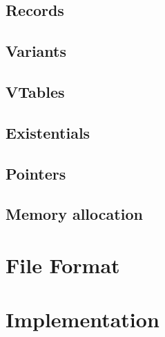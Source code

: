 \documentclass[a4paper]{book}
\begin{document}
\chapter{Records}

\chapter{Variants}
\chapter{VTables}
\chapter{Existentials}

\chapter{Pointers}

\chapter{Memory allocation}



\part{File Format}
\part{Implementation}
\end{document}

